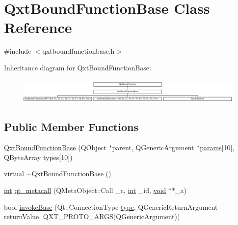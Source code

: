 \hypertarget{class_qxt_bound_function_base}{\section{Qxt\-Bound\-Function\-Base Class Reference}
\label{class_qxt_bound_function_base}
}


{\ttfamily \#include $<$qxtboundfunctionbase.\-h$>$}

Inheritance diagram for Qxt\-Bound\-Function\-Base\-:\begin{figure}[H]
\begin{center}
\leavevmode
\includegraphics[height=1.266968cm]{class_qxt_bound_function_base}
\end{center}
\end{figure}
\subsection*{Public Member Functions}
\begin{DoxyCompactItemize}
\item 
\hyperlink{class_qxt_bound_function_base_acfbff17c92cd245423b3043943303002}{Qxt\-Bound\-Function\-Base} (Q\-Object $\ast$parent, Q\-Generic\-Argument $\ast$\hyperlink{glext_8h_afeb6390ab3bc8a0e96a88aff34d52288}{params}\mbox{[}10\mbox{]}, Q\-Byte\-Array types\mbox{[}10\mbox{]})
\item 
virtual \hyperlink{class_qxt_bound_function_base_aa8d05e437abf69cd82ae05dc97f4d5c7}{$\sim$\-Qxt\-Bound\-Function\-Base} ()
\item 
\hyperlink{ioapi_8h_a787fa3cf048117ba7123753c1e74fcd6}{int} \hyperlink{class_qxt_bound_function_base_a5af8a288a1496b4c2e198bccefcc17d5}{qt\-\_\-metacall} (Q\-Meta\-Object\-::\-Call \-\_\-c, \hyperlink{ioapi_8h_a787fa3cf048117ba7123753c1e74fcd6}{int} \-\_\-id, \hyperlink{group___u_a_v_objects_plugin_ga444cf2ff3f0ecbe028adce838d373f5c}{void} $\ast$$\ast$\-\_\-a)
\item 
bool \hyperlink{class_qxt_bound_function_base_af3aa48286e56b756f593ac348f901620}{invoke\-Base} (Qt\-::\-Connection\-Type \hyperlink{glext_8h_a7d05960f4f1c1b11f3177dc963a45d86}{type}, Q\-Generic\-Return\-Argument return\-Value, Q\-X\-T\-\_\-\-P\-R\-O\-T\-O\-\_\-A\-R\-G\-S(Q\-Generic\-Argument))
\end{DoxyCompactItemize}
